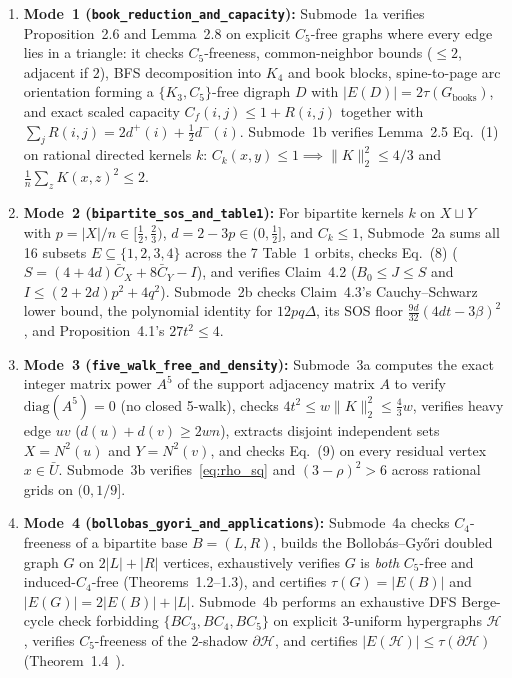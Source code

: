 \documentclass[10pt,twocolumn]{article}
\begin{document}
\begin{enumerate}\itemsep 1.5pt
\item \textbf{Mode~1 (\nolinkurl{book_reduction_and_capacity}):} Submode~1a verifies Proposition~2.6 and Lemma~2.8 on explicit $C_5$-free graphs where every edge lies in a triangle: it checks $C_5$-freeness, common-neighbor bounds ($\le 2$, adjacent if $2$), BFS decomposition into $K_4$ and book blocks, spine-to-page arc orientation forming a $\{K_3, C_5\}$-free digraph $D$ with $|E(D)| = 2\tau(G_{\mathrm{books}})$, and exact scaled capacity $C_f(i,j) \le 1 + R(i,j)$ together with $\sum_j R(i,j) = 2d^+(i) + \tfrac{1}{2}d^-(i)$. Submode~1b verifies Lemma~2.5 Eq.~(1) on rational directed kernels $k$: $C_k(x,y) \le 1 \implies \|K\|_2^2 \le 4/3$ and $\tfrac{1}{n}\sum_z K(x,z)^2 \le 2$.
\item \textbf{Mode~2 (\nolinkurl{bipartite_sos_and_table1}):} For bipartite kernels $k$ on $X \sqcup Y$ with $p = |X|/n \in [\tfrac{1}{2}, \tfrac{2}{3})$, $d = 2 - 3p \in (0, \tfrac{1}{2}]$, and $C_k \le 1$, Submode~2a sums all 16 subsets $E \subseteq \{1,2,3,4\}$ across the 7 Table~1 orbits, checks Eq.~(8) ($S = (4+4d)\bar{C}_X + 8\bar{C}_Y - I$), and verifies Claim~4.2 ($B_0 \le J \le S$ and $I \le (2+2d)p^2 + 4q^2$). Submode~2b checks Claim~4.3's Cauchy--Schwarz lower bound, the polynomial identity for $12pq\Delta$, its SOS floor $\tfrac{9d}{32}(4dt-3\beta)^2$, and Proposition~4.1's $27t^2 \le 4$.
\item \textbf{Mode~3 (\nolinkurl{five_walk_free_and_density}):} Submode~3a computes the exact integer matrix power $A^5$ of the support adjacency matrix $A$ to verify $\mathrm{diag}(A^5) = 0$ (no closed 5-walk), checks $4t^2 \le w\|K\|_2^2 \le \tfrac{4}{3}w$, verifies heavy edge $uv$ ($d(u)+d(v) \ge 2wn$), extracts disjoint independent sets $X = N^2(u)$ and $Y = N^2(v)$, and checks Eq.~(9) on every residual vertex $x \in \bar{U}$. Submode~3b verifies~\eqref{eq:rho_sq} and $(3-\rho)^2 > 6$ across rational grids on $(0, 1/9]$.
\item \textbf{Mode~4 (\nolinkurl{bollobas_gyori_and_applications}):} Submode~4a checks $C_4$-freeness of a bipartite base $B=(L,R)$, builds the Bollob\'as--Gy\H{o}ri doubled graph $G$ on $2|L|+|R|$ vertices, exhaustively verifies $G$ is \emph{both} $C_5$-free and induced-$C_4$-free (Theorems~1.2--1.3), and certifies $\tau(G)=|E(B)|$ and $|E(G)|=2|E(B)|+|L|$. Submode~4b performs an exhaustive DFS Berge-cycle check forbidding $\{BC_3, BC_4, BC_5\}$ on explicit 3-uniform hypergraphs $\mathcal{H}$, verifies $C_5$-freeness of the 2-shadow $\partial\mathcal{H}$, and certifies $|E(\mathcal{H})| \le \tau(\partial\mathcal{H})$ (Theorem~1.4~\cite{FurediOzkahya2017,ErgeGyoriMethuku2019Berge}).
\end{enumerate}
\end{document}
